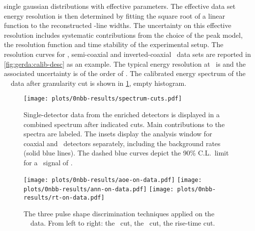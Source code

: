 single gaussian distributions with effective parameters. The effective data set energy
resolution is then determined by fitting the square root of a linear function to the
reconstructed \g-line widths. The uncertainty on this effective resolution includes
systematic contributions from the choice of the peak model, the resolution function and
time stability of the experimental setup.  The resolution curves for \bege, semi-coaxial
and inverted-coaxial \phasetwop\ data sets are reported in \cref{fig:gerda:calib-desc} as
an example. The typical energy resolution at \qbb\ is  and the associated
uncertainty is of the order of . The calibrated energy spectrum of the
\gerda\ \phasetwo\ data after granularity cut is shown in \cref{fig:gerda:spectrum-cuts},
empty histogram. 

\begin{figure}
  \centering
  \texttt{[image: plots/0nbb-results/spectrum-cuts.pdf]}
  \caption{%
    Single-detector data from the enriched detectors is displayed in a combined spectrum
    after indicated cuts. Main contributions to the spectra are labeled. The insets
    display the analysis window for coaxial and \bege\ detectors separately, including the
    background rates (solid blue lines). The dashed blue curves depict the 90\% C.L.~limit
    for a \onbb\ signal of \gerdafinallimit. 
  }\label{fig:gerda:spectrum-cuts}
\end{figure}

\begin{figure}
  \centering
  \texttt{[image: plots/0nbb-results/aoe-on-data.pdf]}%
  \texttt{[image: plots/0nbb-results/ann-on-data.pdf]}
  \texttt{[image: plots/0nbb-results/rt-on-data.pdf]}
  \caption{%
    The three pulse shape discrimination techniques applied on the \gerda\ \phasetwo\
    data. From left to right: the \aoe\ cut, the \annmse\ cut, the rise-time cut.
    \fillme{to be updated with full data}
  }\label{fig:gerda:psd-on-data}
\end{figure}


